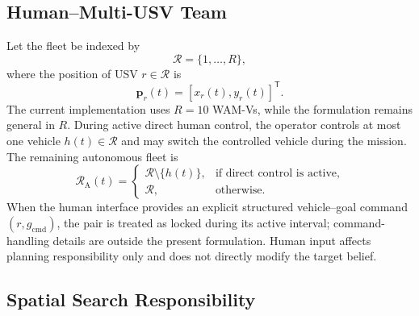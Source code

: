 \documentclass[letterpaper, 10pt, conference]{ieeeconf}
\begin{document}
\subsection{Human--Multi-USV Team}

Let the fleet be indexed by
\begin{equation}
  \mathcal{R} = \{1, \ldots, R\},
  \label{eq:fleet}
\end{equation}
where the position of USV \(r \in \mathcal{R}\) is
\begin{equation}
  \mathbf{p}_r(t) = [x_r(t), y_r(t)]^\mathsf{T}.
  \label{eq:usv_position}
\end{equation}
The current implementation uses \(R=10\) WAM-Vs, while the formulation remains general in \(R\). During active direct human control, the operator controls at most one vehicle \(h(t) \in \mathcal{R}\) and may switch the controlled vehicle during the mission. The remaining autonomous fleet is
\begin{equation}
  \mathcal{R}_{\mathrm{A}}(t) =
  \begin{cases}
    \mathcal{R} \setminus \{h(t)\}, & \text{if direct control is active}, \\
    \mathcal{R}, & \text{otherwise}.
  \end{cases}
  \label{eq:autonomous_fleet}
\end{equation}
When the human interface provides an explicit structured vehicle--goal command \((r,g_{\mathrm{cmd}})\), the pair is treated as locked during its active interval; command-handling details are outside the present formulation. Human input affects planning responsibility only and does not directly modify the target belief.

\subsection{Spatial Search Responsibility}
\end{document}
